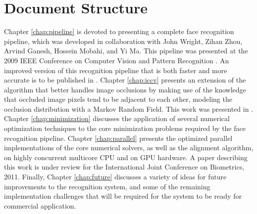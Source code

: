 \section{Document Structure}
%
Chapter \ref{chap:pipeline} is devoted to presenting a complete face
recognition pipeline, which was developed in collaboration with John Wright,
Zihan Zhou, Arvind Ganesh, Hossein Mobahi, and Yi Ma.  This pipeline was
presented at the 2009 IEEE Conference on Computer Vision and Pattern Recognition
\cite{WagnerA2009-CVPR}.  An improved version of this recognition pipeline that
is both faster and more accurate is to be published in \cite{WagnerA2011-PAMI}.
%
Chapter \ref{chap:iccv} presents an extension of the algorithm that better
handles image occlusions by making use of the knowledge that occluded image
pixels tend to be adjacent to each other, modeling the occlusion distribution
with a Markov Random Field.  This work was presented in \cite{ZhouZ2009}.
%
Chapter \ref{chap:minimization} discusses the application of several numerical
optimization techniques to the core minimization problems required by the face
recognition pipeline.
%
Chapter \ref{chap:parallel} presents the optimized parallel implementations of
the core numerical solvers, as well as the alignment algorithm, on highly
concurrent multicore CPU and on GPU hardware.  A paper describing this work
is under review for the International Joint Conference on Biometrics, 2011.
%
Finally, Chapter \ref{chap:future} discusses a variety of ideas for future
improvements to the recognition system, and some of the remaining
implementation challenges that will be required for the system to be ready for
commercial application.
 
